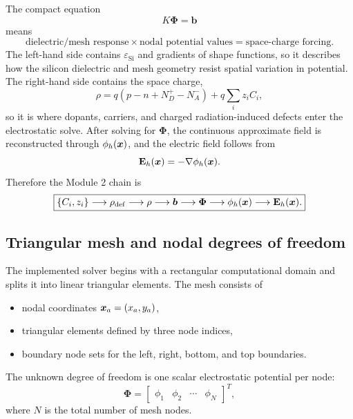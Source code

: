 \documentclass[11pt]{article}
\newcommand{\Evec}{\mathbf{E}}
\begin{document}
The compact equation
\begin{equation}
K\bm{\Phi}=\bm{b}
\end{equation}
means
\begin{equation}
\text{dielectric/mesh response} \times \text{nodal potential values}
= \text{space-charge forcing}.
\end{equation}
The left-hand side contains $\varepsilon_{\mathrm{Si}}$ and gradients of shape functions, so it describes how the silicon dielectric and mesh geometry resist spatial variation in potential. The right-hand side contains the space charge,
\begin{equation}
\rho = q(p-n+N_D^+-N_A^-)+q\sum_i z_i C_i,
\end{equation}
so it is where dopants, carriers, and charged radiation-induced defects enter the electrostatic solve. After solving for $\bm{\Phi}$, the continuous approximate field is reconstructed through $\phi_h(\bm{x})$, and the electric field follows from
\begin{equation}
\Evec_h(\xvec) = -\nabla \phi_h(\xvec).
\end{equation}
Therefore the Module 2 chain is
\begin{equation}
\boxed{
\{C_i,z_i\}
\longrightarrow \rho_{\mathrm{def}}
\longrightarrow \rho
\longrightarrow \bm{b}
\longrightarrow \bm{\Phi}
\longrightarrow \phi_h(\xvec)
\longrightarrow \Evec_h(\xvec).
}
\end{equation}


\subsection{Triangular mesh and nodal degrees of freedom}

The implemented solver begins with a rectangular computational domain and splits it into linear triangular elements. The mesh consists of
\begin{itemize}[leftmargin=1.5em]
    \item nodal coordinates $\bm{x}_a=(x_a,y_a)$,
    \item triangular elements defined by three node indices,
    \item boundary node sets for the left, right, bottom, and top boundaries.
\end{itemize}

The unknown degree of freedom is one scalar electrostatic potential per node:
\begin{equation}
\bm{\Phi} =
\begin{bmatrix}
\phi_1 & \phi_2 & \cdots & \phi_N
\end{bmatrix}^{T},
\end{equation}
where $N$ is the total number of mesh nodes.
\end{document}
